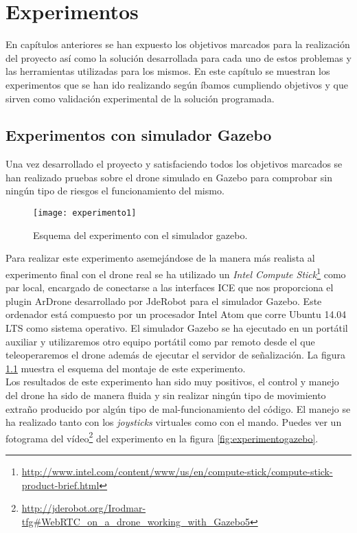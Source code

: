 \chapter{Experimentos}

En capítulos anteriores se han expuesto los objetivos marcados para la realización del proyecto así como la solución desarrollada para cada uno de estos problemas y las herramientas utilizadas para los mismos. En este capítulo se muestran los experimentos que se han ido realizando según íbamos cumpliendo objetivos y que sirven como validación experimental de la solución programada.\\

\section{Experimentos con simulador Gazebo}

Una vez desarrollado el proyecto y satisfaciendo todos los objetivos marcados se han realizado pruebas sobre el drone simulado en Gazebo para comprobar sin ningún tipo de riesgos el funcionamiento del mismo.\\

\begin{figure}[h!]
\centering
\texttt{[image: experimento1]}
\caption{Esquema del experimento con el simulador gazebo.}
\label{fig:esquemaexperimento1}
\end{figure}

Para realizar este experimento asemejándose de la manera más realista al experimento final con el drone real se ha utilizado un \emph{Intel Compute Stick}\footnote{\url{http://www.intel.com/content/www/us/en/compute-stick/compute-stick-product-brief.html}} como par local, encargado de conectarse a las interfaces ICE que nos proporciona el plugin ArDrone desarrollado por JdeRobot para el simulador Gazebo. Este ordenador está compuesto por un procesador Intel Atom que corre Ubuntu 14.04 LTS como sistema operativo. El simulador Gazebo se ha ejecutado en un portátil auxiliar y utilizaremos otro equipo portátil como par remoto desde el que teleoperaremos el drone además de ejecutar el servidor de señalización. La figura \ref{fig:esquemaexperimento1} muestra el esquema del montaje de este experimento. \\

Los resultados de este experimento han sido muy positivos, el control y manejo del drone ha sido de manera fluida y sin realizar ningún tipo de movimiento extraño producido por algún tipo de mal-funcionamiento del código. El manejo se ha realizado tanto con los \emph{joysticks} virtuales como con el mando. Puedes ver un fotograma del vídeo\footnote{\url{http://jderobot.org/Irodmar-tfg#WebRTC_on_a_drone_working_with_Gazebo5}} del experimento en la figura \ref{fig:experimentogazebo}.\\

